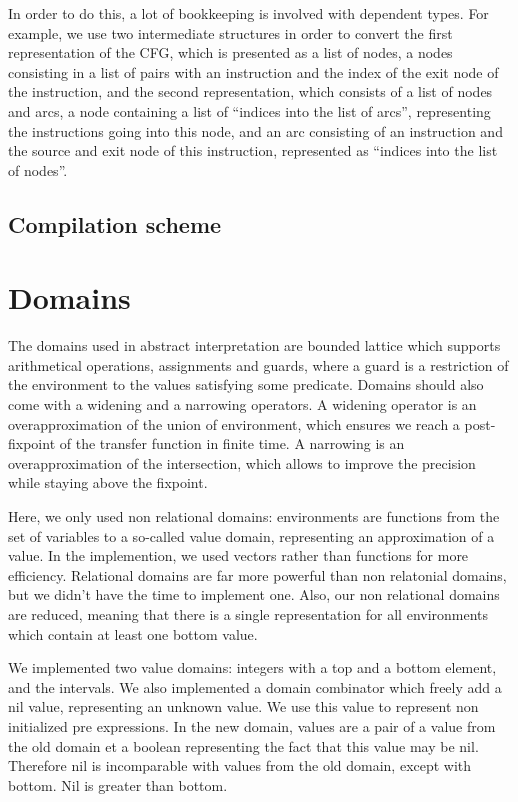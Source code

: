 \documentclass{scrartcl}
\begin{document}
In order to do this, a lot of bookkeeping is involved with dependent types.
For example, we use two intermediate structures in order
to convert the first representation of the CFG, which is presented
as a list of nodes, a nodes consisting in a list of pairs with an instruction
and the index of the exit node of the instruction, and the second
representation, which consists of a list of nodes and arcs, a node
containing a list of ``indices into the list of arcs'', representing the
instructions going into this node, and an arc consisting of an instruction
and the source and exit node of this instruction, represented as ``indices into the list of nodes''.

\subsection{Compilation scheme}

\section{Domains}

The domains used in abstract interpretation are bounded lattice
which supports arithmetical operations, assignments and guards,
where a guard is a restriction of the environment to the values
satisfying some predicate. Domains should also come with
a widening and a narrowing operators. A widening operator
is an overapproximation of the union of environment, which
ensures we reach a post-fixpoint of the transfer function in
finite time. A narrowing is an overapproximation of the
intersection, which allows to improve the precision while
staying above the fixpoint.

Here, we only used non relational domains: environments are functions
from the set of variables to a so-called value domain, representing
an approximation of a value. In the implemention, we used vectors rather
than functions for more efficiency. Relational domains are far more
powerful than non relatonial domains, but we didn't have the time to
implement one. Also, our non relational domains are reduced, meaning
that there is a single representation for all environments which contain
at least one bottom value.

We implemented two value domains: integers with a top and a
bottom element, and the intervals. We also implemented a domain
combinator which freely add a nil value, representing an
unknown value. We use this value to represent non initialized
pre expressions. In the new domain, values are a pair of
a value from the old domain et a boolean representing the
fact that this value may be nil. Therefore nil is incomparable
with values from the old domain, except with bottom. Nil is greater
than bottom.
\end{document}
